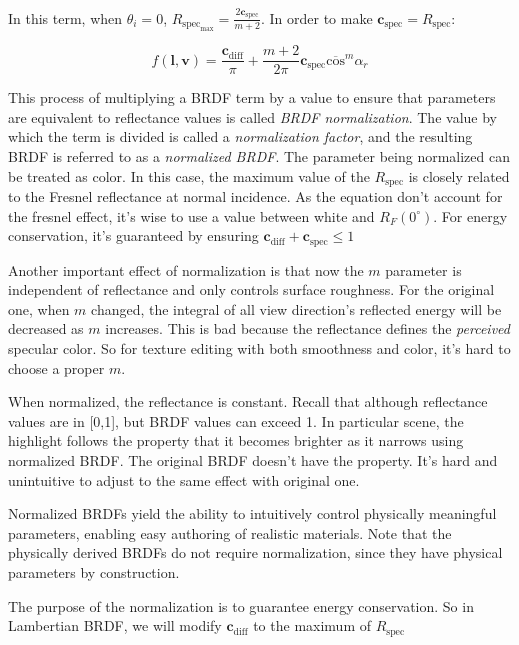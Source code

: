 \documentclass[10pt, a4paper]{article}
\begin{document}
        In this term, when $\theta_i = 0$, $R_{\text{spec}_{\text{max}}} = \frac{2\textbf{c}_{\text{spec}}}{m + 2}$. In order to make $\textbf{c}_{\text{spec}} = R_{\text{spec}}$: 

        $$f(\textbf{l}, \textbf{v}) = \frac{\textbf{c}_{\text{diff}}}{\pi} + \frac{m + 2}{2\pi}\textbf{c}_{\text{spec}}\overline{\text{cos}}^m\alpha_r$$

        This process of multiplying a BRDF term by a value to ensure that parameters are  equivalent to reflectance values is called \emph{BRDF normalization}. The value by which the term is divided is called a \emph{normalization factor}, and the resulting BRDF is referred to as a \emph{normalized BRDF}. The parameter being normalized can be treated as color. In this case, the maximum value of the $R_{\text{spec}}$ is closely related to the Fresnel reflectance at normal incidence. As the equation don't account for the fresnel effect, it's wise to use a value between white and $R_F(0^{\circ})$. For energy conservation, it's guaranteed by ensuring $\textbf{c}_{\text{diff}} + \textbf{c}_{\text{spec}} \leqslant 1$

        Another important effect of normalization is that now the $m$ parameter is independent of reflectance and only controls surface roughness. For the original one, when $m$ changed, the integral of all view direction's reflected energy will be decreased as $m$ increases. This is bad because the reflectance defines the \emph{perceived} specular color. So for texture editing with both smoothness and color, it's hard to choose a proper $m$. 

        When normalized, the reflectance is constant. Recall that although reflectance values are in [0,1], but BRDF values can exceed 1. In particular scene, the highlight follows the property that it becomes brighter as it narrows using normalized BRDF. The original BRDF doesn't have the property. It's hard and unintuitive to adjust to the same effect with original one. 
        
        Normalized BRDFs yield the ability to intuitively control physically meaningful parameters, enabling easy authoring of realistic materials. Note that the physically derived BRDFs do not require normalization, since they have physical parameters by construction. 

        The purpose of the normalization is to guarantee energy conservation. So in Lambertian BRDF, we will modify $\textbf{c}_{\text{diff}}$ to the maximum of $R_{\text{spec}}$
        
\end{document}
